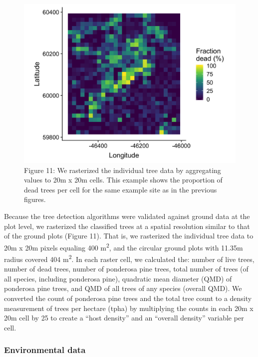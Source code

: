 \documentclass[]{article}
\begin{document}
\begin{figure}
\centering
\includegraphics{../../figures/proportion-dead-rasterized.png}
\caption{Figure 11: We rasterized the individual tree data by
aggregating values to 20m x 20m cells. This example shows the proportion
of dead trees per cell for the same example site as in the previous
figures.}
\end{figure}

Because the tree detection algorithms were validated against ground data
at the plot level, we rasterized the classified trees at a spatial
resolution similar to that of the ground plots (Figure 11). That is, we
rasterized the individual tree data to 20m x 20m pixels equaling 400
m\textsuperscript{2}, and the circular ground plots with 11.35m radius
covered 404 m\textsuperscript{2}. In each raster cell, we calculated
the: number of live trees, number of dead trees, number of ponderosa
pine trees, total number of trees (of all species, including ponderosa
pine), quadratic mean diameter (QMD) of ponderosa pine trees, and QMD of
all trees of any species (overall QMD). We converted the count of
ponderosa pine trees and the total tree count to a density measurement
of trees per hectare (tpha) by multiplying the counts in each 20m x 20m
cell by 25 to create a ``host density'' and an ``overall density''
variable per cell.

\subsubsection{Environmental data}\label{environmental-data}
\end{document}
